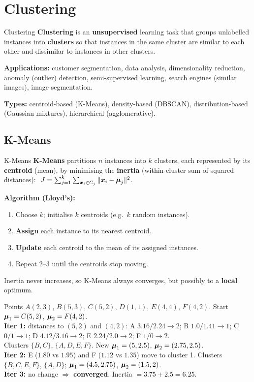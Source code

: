 \chapter{Clustering}\label{n:cluster}

\begin{dfn}{Clustering}
\textbf{Clustering} is an \textbf{unsupervised} learning task that groups unlabelled instances into \textbf{clusters} so that instances in the same cluster are similar to each other and dissimilar to instances in other clusters.
\end{dfn}
\textbf{Applications:} customer segmentation, data analysis, dimensionality reduction, anomaly (outlier) detection, semi-supervised learning, search engines (similar images), image segmentation.

\textbf{Types:} centroid-based (K-Means), density-based (DBSCAN), distribution-based (Gaussian mixtures), hierarchical (agglomerative).

\section{K-Means}
\begin{dfn}{K-Means}
\textbf{K-Means} partitions $n$ instances into $k$ clusters, each represented by its \textbf{centroid} (mean), by minimising the \textbf{inertia} (within-cluster sum of squared distances):
$\ J=\sum_{j=1}^k\sum_{\boldsymbol{x}_i\in C_j}\|\boldsymbol{x}_i-\boldsymbol{\mu}_j\|^2$.
\end{dfn}
\textbf{Algorithm (Lloyd's):}
\begin{enumerate}
  \item Choose $k$; initialise $k$ centroids (e.g.\ $k$ random instances).
  \item \textbf{Assign} each instance to its nearest centroid.
  \item \textbf{Update} each centroid to the mean of its assigned instances.
  \item Repeat 2--3 until the centroids stop moving.
\end{enumerate}
Inertia never increases, so K-Means always converges, but possibly to a \textbf{local} optimum.

\begin{numer}[: K-Means, $k=2$]
Points $A(2,3)$, $B(5,3)$, $C(5,2)$, $D(1,1)$, $E(4,4)$, $F(4,2)$. Start $\boldsymbol{\mu}_1=C(5,2)$, $\boldsymbol{\mu}_2=F(4,2)$.\\
\textbf{Iter 1:} distances to $(5,2)$ and $(4,2)$: A $3.16/2.24\to2$; B $1.0/1.41\to1$; C $0/1\to1$; D $4.12/3.16\to2$; E $2.24/2.0\to2$; F $1/0\to2$.\\
Clusters $\{B,C\}$, $\{A,D,E,F\}$. New $\boldsymbol{\mu}_1=(5,2.5)$, $\boldsymbol{\mu}_2=(2.75,2.5)$.\\
\textbf{Iter 2:} E ($1.80$ vs $1.95$) and F ($1.12$ vs $1.35$) move to cluster 1. Clusters $\{B,C,E,F\}$, $\{A,D\}$; $\boldsymbol{\mu}_1=(4.5,2.75)$, $\boldsymbol{\mu}_2=(1.5,2)$.\\
\textbf{Iter 3:} no change $\Rightarrow$ \textbf{converged}. Inertia $=3.75+2.5=6.25$.
\end{numer}

